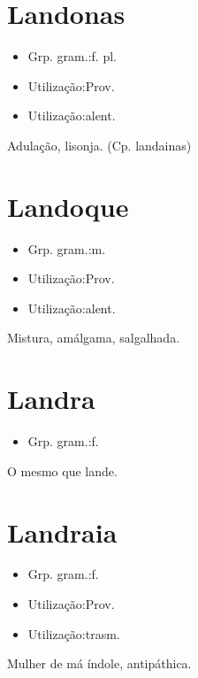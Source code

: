 \section{Landonas}
\begin{itemize}
\item {Grp. gram.:f. pl.}
\end{itemize}
\begin{itemize}
\item {Utilização:Prov.}
\end{itemize}
\begin{itemize}
\item {Utilização:alent.}
\end{itemize}
Adulação, lisonja.
(Cp. \textunderscore landainas\textunderscore )
\section{Landoque}
\begin{itemize}
\item {Grp. gram.:m.}
\end{itemize}
\begin{itemize}
\item {Utilização:Prov.}
\end{itemize}
\begin{itemize}
\item {Utilização:alent.}
\end{itemize}
Mistura, amálgama, salgalhada.
\section{Landra}
\begin{itemize}
\item {Grp. gram.:f.}
\end{itemize}
O mesmo que \textunderscore lande\textunderscore .
\section{Landraia}
\begin{itemize}
\item {Grp. gram.:f.}
\end{itemize}
\begin{itemize}
\item {Utilização:Prov.}
\end{itemize}
\begin{itemize}
\item {Utilização:trasm.}
\end{itemize}
Mulher de má índole, antipáthica.
